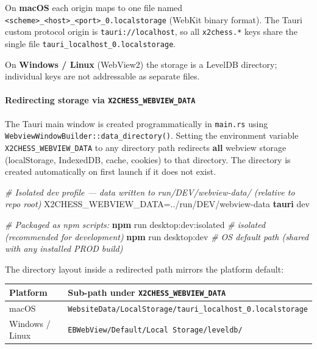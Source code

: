 \documentclass[]{article}
\newenvironment{Shaded}{\begin{snugshade}}{\end{snugshade}}
\newcommand{\KeywordTok}[1]{\textcolor[rgb]{0.13,0.29,0.53}{\textbf{{#1}}}}
\newcommand{\CommentTok}[1]{\textcolor[rgb]{0.56,0.35,0.01}{\textit{{#1}}}}
\newcommand{\OtherTok}[1]{\textcolor[rgb]{0.56,0.35,0.01}{{#1}}}
\newcommand{\NormalTok}[1]{{#1}}
\let\oldparagraph\paragraph
\renewcommand{\paragraph}[1]{\oldparagraph{#1}\mbox{}}
\begin{document}
On \textbf{macOS} each origin maps to one file named
\texttt{\textless{}scheme\textgreater{}\_\textless{}host\textgreater{}\_\textless{}port\textgreater{}\_0.localstorage}
(WebKit binary format). The Tauri custom protocol origin is
\texttt{tauri://localhost}, so all \texttt{x2chess.*} keys share the
single file \texttt{tauri\_localhost\_0.localstorage}.

On \textbf{Windows / Linux} (WebView2) the storage is a LevelDB
directory; individual keys are not addressable as separate files.

\paragraph{\texorpdfstring{Redirecting storage via
\texttt{X2CHESS\_WEBVIEW\_DATA}}{Redirecting storage via X2CHESS\_WEBVIEW\_DATA}}\label{redirecting-storage-via-x2chess_webview_data}

The Tauri main window is created programmatically in \texttt{main.rs}
using \texttt{WebviewWindowBuilder::data\_directory()}. Setting the
environment variable \texttt{X2CHESS\_WEBVIEW\_DATA} to any directory
path redirects \textbf{all} webview storage (localStorage, IndexedDB,
cache, cookies) to that directory. The directory is created
automatically on first launch if it does not exist.

\begin{Shaded}
\begin{Highlighting}[]
\CommentTok{# Isolated dev profile — data written to run/DEV/webview-data/ (relative to repo root)}
\OtherTok{X2CHESS_WEBVIEW_DATA=}\NormalTok{../run/DEV/webview-data  }\KeywordTok{tauri} \NormalTok{dev}

\CommentTok{# Packaged as npm scripts:}
\KeywordTok{npm} \NormalTok{run desktop:dev:isolated    }\CommentTok{# isolated (recommended for development)}
\KeywordTok{npm} \NormalTok{run desktop:dev             }\CommentTok{# OS default path (shared with any installed PROD build)}
\end{Highlighting}
\end{Shaded}

The directory layout inside a redirected path mirrors the platform
default:

\begin{longtable}[]{@{}ll@{}}
\toprule
Platform & Sub-path under \texttt{X2CHESS\_WEBVIEW\_DATA}\tabularnewline
\midrule
\endhead
macOS &
\texttt{WebsiteData/LocalStorage/tauri\_localhost\_0.localstorage}\tabularnewline
Windows / Linux &
\texttt{EBWebView/Default/Local\ Storage/leveldb/}\tabularnewline
\bottomrule
\end{longtable}
\end{document}
